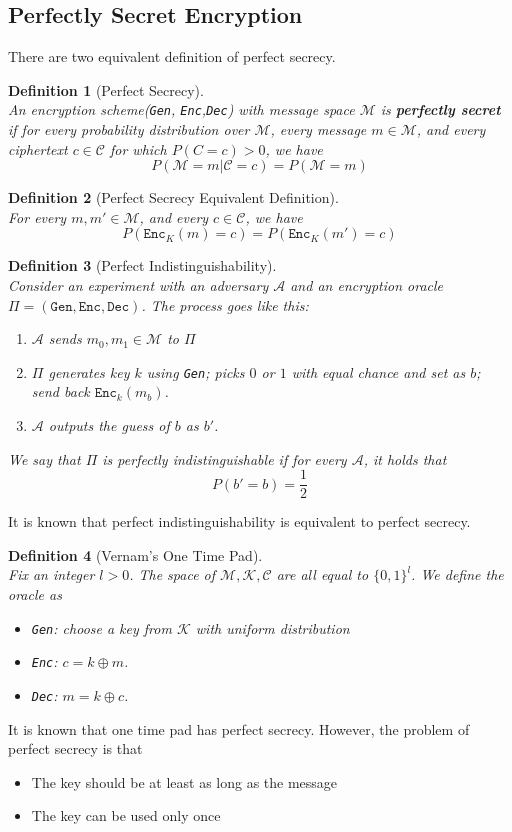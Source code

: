 \documentclass[12pt]{article}
\newtheorem{definition}{Definition}[section]
\theoremstyle{definition}
\begin{document}
\subsection{Perfectly Secret Encryption}
There are two equivalent definition of perfect secrecy.
\begin{definition}[Perfect Secrecy]
\hfill\\\normalfont An encryption scheme(\texttt{Gen}, \texttt{Enc},\texttt{Dec}) with message space $\mathcal{M}$ is \textbf{perfectly secret} if for \textit{every} probability distribution over $\mathcal{M}$, every message $m\in \mathcal{M}$, and every ciphertext $c\in \mathcal{C}$ for which $P(C=c)>0$, we have
\[
P(\mathcal{M}=m|\mathcal{C}=c) = P(\mathcal{M}=m)
\]
\end{definition}
\begin{definition}[Perfect Secrecy Equivalent Definition]
\hfill\\\normalfont For every $m, m'\in\mathcal{M}$, and every $c\in\mathcal{C}$, we have
\[
P(\texttt{Enc}_K(m)=c) = P(\texttt{Enc}_K(m') = c)
\]
\end{definition}
\begin{definition}[Perfect Indistinguishability]
\hfill\\\normalfont Consider an experiment with an adversary $\mathcal{A}$ and an encryption oracle $\Pi=(\texttt{Gen}, \texttt{Enc},\texttt{Dec})$. The process goes like this:
\begin{enumerate}
  \item $\mathcal{A}$ sends $m_0, m_1\in\mathcal{M}$ to $\Pi$
  \item $\Pi$ generates key $k$ using \texttt{Gen}; picks $0$ or $1$ with equal chance and set as $b$; send back $\texttt{Enc}_k(m_b)$.
  \item $\mathcal{A}$ outputs the guess of $b$ as $b'$.
\end{enumerate}
We say that $\Pi$ is perfectly indistinguishable if for \textit{every} $\mathcal{A}$, it holds that
\[
P(b'=b) = \frac{1}{2}
\]
\end{definition}
It is known that perfect indistinguishability is equivalent to perfect secrecy.
\begin{definition}[Vernam's One Time Pad]
\hfill\\\normalfont Fix an integer $l>0$. The space of $\mathcal{M}, \mathcal{K}, \mathcal{C}$ are all equal to $\{0,1\}^l$. We define the oracle as
\begin{itemize}
  \item \texttt{Gen}: choose a key from $\mathcal{K}$ with uniform distribution
  \item \texttt{Enc}: $c=k\oplus m$.
  \item \texttt{Dec}: $m=k\oplus c$.
\end{itemize}
\end{definition}
It is known that one time pad has perfect secrecy. However, the problem of perfect secrecy is that
\begin{itemize}
  \item The key should be at least as long as the message
  \item The key can be used only once
\end{itemize}
\end{document}
